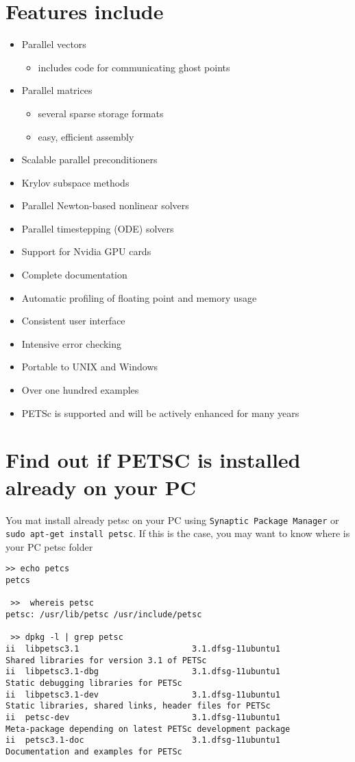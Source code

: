 \documentclass{article}
\begin{document}
\section{Features include}
\begin{itemize}
 \item     Parallel vectors
 \begin{itemize}
  \item includes code for communicating ghost points
 \end{itemize}       
 \item   Parallel matrices
   \begin{itemize}
  \item  several sparse storage formats
  \item  easy, efficient assembly
 \end{itemize}     
\item      Scalable parallel preconditioners
\item      Krylov subspace methods
\item      Parallel Newton-based nonlinear solvers
\item      Parallel timestepping (ODE) solvers
\item      Support for Nvidia GPU cards
\item      Complete documentation
\item      Automatic profiling of floating point and memory usage
\item      Consistent user interface
\item      Intensive error checking
\item      Portable to UNIX and Windows
\item      Over one hundred examples
\item      PETSc is supported and will be actively enhanced for many years
\end{itemize}
\section{Find out if PETSC is installed already on your PC}
You mat install already petsc on your PC using \verb+Synaptic Package Manager+ or \verb+sudo apt-get install petsc+. If this is the case,
you may want to know where is your PC petsc folder 
\begin{scriptsize}\begin{verbatim}
>> echo petcs
petcs

 >>  whereis petsc
petsc: /usr/lib/petsc /usr/include/petsc

 >> dpkg -l | grep petsc
ii  libpetsc3.1                       3.1.dfsg-11ubuntu1                    Shared libraries for version 3.1 of PETSc
ii  libpetsc3.1-dbg                   3.1.dfsg-11ubuntu1                    Static debugging libraries for PETSc
ii  libpetsc3.1-dev                   3.1.dfsg-11ubuntu1                    Static libraries, shared links, header files for PETSc
ii  petsc-dev                         3.1.dfsg-11ubuntu1                    Meta-package depending on latest PETSc development package
ii  petsc3.1-doc                      3.1.dfsg-11ubuntu1                    Documentation and examples for PETSc
\end{verbatim}\end{scriptsize}
\end{document}
